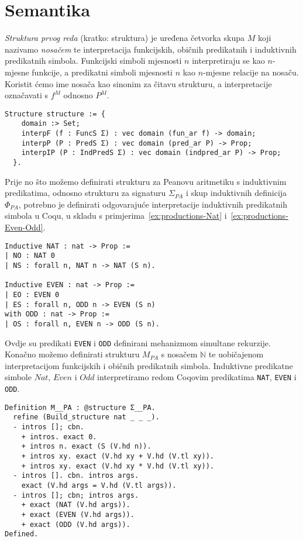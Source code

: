 \section{Semantika}\label{sec:semantika}
\begin{definition}
  \textit{Struktura prvog reda} (kratko: struktura) je uređena četvorka skupa \(M\) koji nazivamo \textit{nosačem}
  te interpretacija funkcijskih, običnih predikatnih i induktivnih predikatnih simbola.
  Funkcijski simboli mjesnosti \(n\) interpretiraju se kao \(n\)-mjesne funkcije, a predikatni simboli mjesnosti \(n\) kao \(n\)-mjesne relacije na nosaču.
  Koristit ćemo ime nosača kao sinonim za čitavu strukturu,
  a interpretacije označavati s \(f^{M}\) odnosno \(P^{M}\).
\begin{verbatim}
Structure structure := {
    domain :> Set;
    interpF (f : FuncS Σ) : vec domain (fun_ar f) -> domain;
    interpP (P : PredS Σ) : vec domain (pred_ar P) -> Prop;
    interpIP (P : IndPredS Σ) : vec domain (indpred_ar P) -> Prop;
  }.
\end{verbatim}
\end{definition}

\begin{example}\label{ex:structure}
  Prije no što možemo definirati strukturu za Peanovu aritmetiku s induktivnim predikatima,
  odnosno strukturu za signaturu \(\Sigma_{\mathit{PA}}\) i skup induktivnih definicija \(\Phi_{\mathit{PA}}\),
  potrebno je definirati odgovarajuće interpretacije induktivnih predikatnih simbola u Coqu, u skladu s primjerima~\ref{ex:productions-Nat} i~\ref{ex:productions-Even-Odd}.
\begin{verbatim}
Inductive NAT : nat -> Prop :=
| NO : NAT 0
| NS : forall n, NAT n -> NAT (S n).

Inductive EVEN : nat -> Prop :=
| EO : EVEN 0
| ES : forall n, ODD n -> EVEN (S n)
with ODD : nat -> Prop :=
| OS : forall n, EVEN n -> ODD (S n).
\end{verbatim}
  \noindent Ovdje su predikati \texttt{EVEN} i \texttt{ODD} definirani mehanizmom simultane rekurzije.\\
  \noindent Konačno možemo definirati strukturu \(M_{\mathit{PA}}\) s nosačem \(\mathbb{N}\) te uobičajenom interpretacijom
  funkcijskih i običnih predikatnih simbola. Induktivne predikatne simbole
  \(\mathit{Nat}\), \(\mathit{Even}\) i \(\mathit{Odd}\)
  interpretiramo redom Coqovim predikatima \texttt{NAT}, \texttt{EVEN} i \texttt{ODD}.
\begin{verbatim}
Definition M__PA : @structure Σ__PA.
  refine (Build_structure nat _ _ _).
  - intros []; cbn.
    + intros. exact 0.
    + intros n. exact (S (V.hd n)).
    + intros xy. exact (V.hd xy + V.hd (V.tl xy)).
    + intros xy. exact (V.hd xy * V.hd (V.tl xy)).
  - intros []. cbn. intros args.
    exact (V.hd args = V.hd (V.tl args)).
  - intros []; cbn; intros args.
    + exact (NAT (V.hd args)).
    + exact (EVEN (V.hd args)).
    + exact (ODD (V.hd args)).
Defined.
\end{verbatim}
\end{example}


